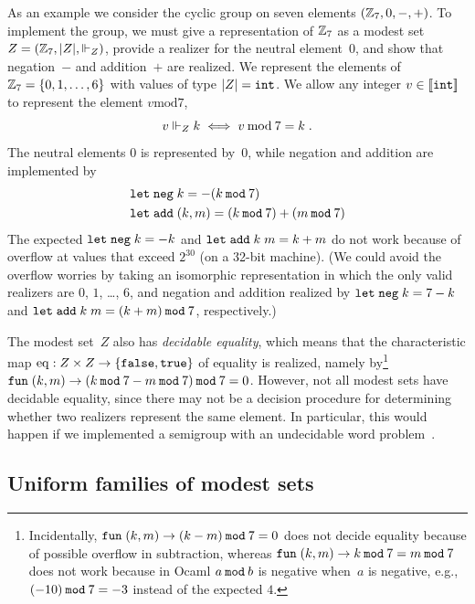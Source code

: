 \bigskip

As an example we consider the cyclic group on seven elements $(\mathbb{Z}_7,
0, {-}, {+})$. To implement the group, we must give a representation
of $\mathbb{Z}_7$ as a modest set~$Z = (\mathbb{Z}_7, |Z|, {\Vdash_Z})$, provide
a realizer for the neutral element~$0$, and show that negation~$-$ and
addition~$+$ are realized. We represent the elements of~$\mathbb{Z}_7 =
\{0, 1, \ldots, 6\}$ with values of type $|Z| = \mathtt{int}$. We
allow any integer $v \in [\![\mathtt{int}]\!]$ to represent the element $v
\mathbin{\mathrm{mod}} 7$,
%
\begin{equation*}
  v \Vdash_Z k \iff v \mathbin{\mathrm{mod}} 7 = k \;.
\end{equation*}
%
The neutral elements $0$ is represented by~$0$, while negation and
addition are implemented by
%
\begin{align*}
  &\mathtt{let}\;\mathtt{neg}\; k = -(k \mathbin{\mathtt{mod}} 7) \\
  &\mathtt{let}\;\mathtt{add}\; (k, m) = (k \mathbin{\mathtt{mod}} 7) + (m \mathbin{\mathtt{mod}} 7)
\end{align*}
%
The expected $\mathtt{let}\;\mathtt{neg}\; k = -k$ and $\mathtt{let}\;\mathtt{add}\;
  k\; m = k+m$ do not work because of overflow at values that exceed
$2^{30}$ (on a 32-bit machine). (We could avoid the overflow worries
by taking an isomorphic representation in which the only valid
realizers are $0$, $1$, \ldots, $6$, and negation and addition
realized by $\mathtt{let}\;\mathtt{neg}\; k = 7 - k$ and $\mathtt{let}\;\mathtt{add}\;
  k\; m = (k + m) \mathbin{\mathtt{mod}} 7$, respectively.)

The modest set~$Z$ also has \emph{decidable equality}, which means
that the characteristic map $\mathrm{eq} : Z \times Z \to
\{\mathtt{false}, \mathtt{true}\}$ of equality is realized, namely
by\footnote{Incidentally, $\mathtt{fun}\;(k,m) \to (k - m) \mathbin{\mathtt{mod}} 7 = 0$ does not
  decide equality because of possible overflow in subtraction, whereas
  $\mathtt{fun}\;(k,m) \to k \mathbin{\mathtt{mod}} 7 = m \mathbin{\mathtt{mod}} 7$ does not work because in Ocaml
  $a \mathbin{\mathtt{mod}} b$ is negative when~$a$ is negative, e.g., $(-10) \mathbin{\mathtt{mod}} 7 =
  -3$ instead of the expected $4$.} $\mathtt{fun}\;(k,m) \to (k \mathbin{\mathtt{mod}} 7 - m \mathbin{\mathtt{mod}}
  7) \mathbin{\mathtt{mod}} 7 = 0$. However, not all modest sets have decidable
equality, since there may not be a decision procedure for determining
whether two realizers represent the same element. In particular, this
would happen if we implemented a semigroup with an undecidable word
problem~\cite{post47:_recur_unsol_probl_thue}.


\subsection{Uniform families of modest sets}
\label{sec:uniform-families}

